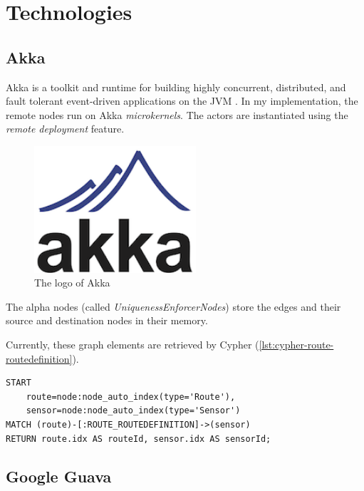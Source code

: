 \section{Technologies}

\subsection{Akka}

Akka is a toolkit and runtime for building highly concurrent, distributed, and fault tolerant event-driven applications on the JVM \cite{akka}. In my implementation, the remote nodes run on Akka \textit{microkernels}. The actors are instantiated using the \textit{remote deployment} feature.

\begin{figure}
\begin{center}
\includegraphics[width=6cm]{figures/akka-logo}
\caption{The logo of Akka}
\label{fig:akka-logo}
\end{center}
\end{figure}

The alpha nodes (called \textit{UniquenessEnforcerNodes}) store the edges and their source and destination nodes in their memory.

Currently, these graph elements are retrieved by Cypher (\autoref{lst:cypher-route-routedefinition}).

\begin{lstlisting}[caption=Cypher query to retrieve all \texttt{ROUTE\_ROUTEDEFINITION} edges, label=lst:cypher-route-routedefinition, breaklines=true]
START
    route=node:node_auto_index(type='Route'),
    sensor=node:node_auto_index(type='Sensor')
MATCH (route)-[:ROUTE_ROUTEDEFINITION]->(sensor)
RETURN route.idx AS routeId, sensor.idx AS sensorId;
\end{lstlisting}

\subsection{Google Guava}

